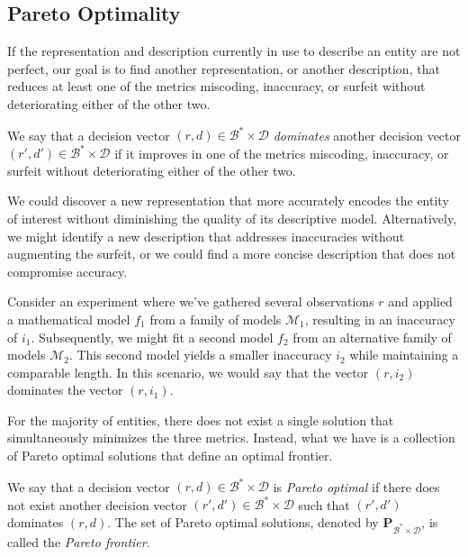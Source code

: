 \subsection*{Pareto Optimality}

If the representation and description currently in use to describe an entity are not perfect, our goal is to find another representation, or another description, that reduces at least one of the metrics miscoding, inaccuracy, or surfeit without deteriorating either of the other two.

\begin{definition}
We say that a decision vector $(r, d) \in \mathcal{B}^\ast \times \mathcal{D}$ \emph{dominates} another decision vector $(r', d') \in \mathcal{B}^\ast \times \mathcal{D}$ if it improves in one of the metrics miscoding, inaccuracy, or surfeit without deteriorating either of the other two.
\end{definition}

We could discover a new representation that more accurately encodes the entity of interest without diminishing the quality of its descriptive model. Alternatively, we might identify a new description that addresses inaccuracies without augmenting the surfeit, or we could find a more concise description that does not compromise accuracy.

\begin{example}
Consider an experiment where we've gathered several observations $r$ and applied a mathematical model $f_1$ from a family of models $\mathcal{M}_1$, resulting in an inaccuracy of $i_1$. Subsequently, we might fit a second model $f_2$ from an alternative family of models $\mathcal{M}_2$. This second model yields a smaller inaccuracy $i_2$ while maintaining a comparable length. In this scenario, we would say that the vector $(r, i_2)$ dominates the vector $(r, i_1)$.
\end{example}

For the majority of entities, there does not exist a single solution that simultaneously minimizes the three metrics. Instead, what we have is a collection of Pareto optimal solutions that define an optimal frontier.

\begin{definition}
We say that a decision vector $(r, d) \in \mathcal{B}^\ast \times \mathcal{D}$ is \emph{Pareto optimal} if there does not exist another decision vector $(r', d') \in \mathcal{B}^\ast \times \mathcal{D}$ such that $(r', d')$ dominates $(r, d)$. The set of Pareto optimal solutions, denoted by $\mathbf{P}_{\mathcal{B}^\ast \times \mathcal{D}}$, is called the \emph{Pareto frontier}.
\end{definition}

